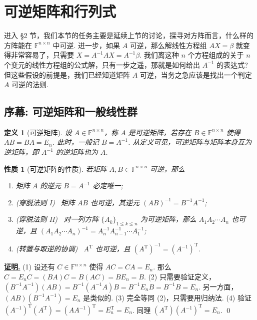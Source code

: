 \documentclass[10pt,openany]{article}
\theoremstyle{thmstyle} %
\theoremstyle{defstyle} %
\newtheorem{definition}[theorem]{定义}
\theoremstyle{prostyle} %
\newtheorem{property}[theorem]{性质}
\theoremstyle{exastyle}
\theoremstyle{remstyle}
\renewenvironment{proof}[1][证明]{\par\underline{\textbf{#1.}} \;\fangsong}{\qed\par}
\newcommand{\T}{^{\text{T}}}
\newcommand{\F}{\mathbb{F}}
\newcommand{\n}{^{n \times n}}
\begin{document}
\pagestyle{fancy}
\rhead{\today}

\setcounter{section}{1}
\section{可逆矩阵和行列式}

进入 \S 2 节，我们本节的任务主要是延续上节的讨论，探寻对方阵而言，什么样的方阵能在 \( \F\n \) 中可逆. 进一步，如果 \( A \) 可逆，那么解线性方程组 \( AX=\beta \) 就变得非常容易了，只需要 \( X=A^{-1}AX=A^{-1}\beta \). 我们离这种 \( n \) 个方程组成的关于 \( n \) 个变元的线性方程组的公式解，只有一步之遥，那就是如何给出 \( A^{-1} \) 的表达式?
但这些假设的前提是，我们已经知道矩阵 \( A \) 可逆，当务之急应该是找出一个判定 \( A \) 可逆的法则. 

\subsection{序幕: 可逆矩阵和一般线性群}
\begin{definition}[可逆矩阵]\label{2.1.1}
	设 \( A \in \F\n \)，称 \( A \) 是可逆矩阵，若存在 \( B \in \F\n \) 使得 \( AB=BA=E_n \). 此时，一般记 \( B=A^{-1} \). 从定义可见，可逆矩阵与矩阵本身互为逆矩阵，即 \( A^{-1} \) 的逆矩阵也为 \( A \).
	
\end{definition}

\begin{property}[可逆矩阵的性质]\label{2.1.2}
	若矩阵 \( A, B \in \F\n \) 可逆，那么
	\begin{enumerate}[(1)]
		\item 矩阵 \( A \) 的逆元 \( B=A^{-1} \) 必定唯一;
		\item (穿脱法则 I) \ 矩阵 \( AB \) 也可逆，其逆元 \( (AB)^{-1}=B^{-1}A^{-1} \);
		\item (穿脱法则 II) \ 对一列方阵 \( \{A_k\}_{1 \leq k \leq n} \) 为可逆矩阵，那么 \( A_1A_2\cdots A_n \) 也可逆，且 \( (A_1A_2\cdots A_n)^{-1}=A_n^{-1}A_{n-1}^{-1}\cdots A_1^{-1} \);
		\item (转置与取逆的协调) \ \( A\T \) 也可逆，且 \( (A\T)^{-1}=(A^{-1})\T \).
	\end{enumerate}
	
\end{property}

\begin{proof}
	(1) 设还有 \( C \in \F\n \) 使得 \( AC=CA=E_n \). 那么 \( C=E_nC=(BA)C=B(AC)=BE_n=B \). (2) 只需要验证定义，\( (B^{-1}A^{-1})(AB)=B^{-1}(A^{-1}A)B=B^{-1}E_nB=B^{-1}B=E_n \). 另一方面，\( (AB)(B^{-1}A^{-1})=E_n \) 是类似的. (3) 完全等同 (2)，只需要用归纳法. (4) 验证 \( (A^{-1})\T(A\T)=(AA^{-1})\T=E_n\T=E_n \). 同理 \( (A\T)(A^{-1})\T= E_n \).
\end{proof}
\end{document}
